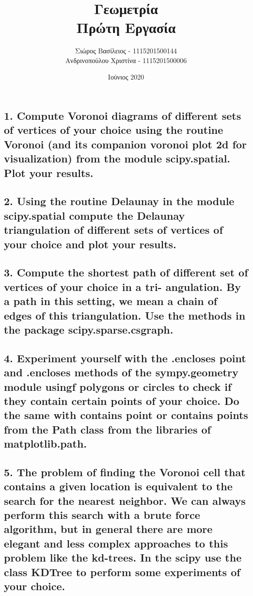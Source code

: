 \documentclass[12pt]{article}
\title{\hugeΥπολογιστική Γεωμετρία\\Πρώτη Εργασία}
\author{Σιώρος Βασίλειος - 1115201500144\\Ανδρινοπούλου Χριστίνα - 1115201500006}
\date{Ιούνιος 2020}
\begin{document}
\maketitle


\pagebreak


\subsection*{1. Compute Voronoi diagrams of different sets of vertices of your choice using
the routine Voronoi (and its companion voronoi plot 2d for visualization) from the module
scipy.spatial. Plot your results.}

\vspace{2in}

\pagebreak

\subsection*{2. Using the routine Delaunay in the module scipy.spatial compute the Delaunay
triangulation of different sets of vertices of your choice and plot your results.}

\vspace{2in}

\pagebreak

\subsection*{3. Compute the shortest path of different set of vertices of your choice in a tri-
angulation. By a path in this setting, we mean a chain of edges of this triangulation. Use the
methods in the package scipy.sparse.csgraph.}

\vspace{2in}

\pagebreak

\subsection*{4. Experiment yourself with the .encloses point and .encloses methods of the
sympy.geometry module usingf polygons or circles to check if they contain certain points of
your choice. Do the same with contains point or contains points from the Path class from the
libraries of matplotlib.path.}

\vspace{2in}

\pagebreak

\subsection*{5. The problem of finding the Voronoi cell that contains a given location is
equivalent to the search for the nearest neighbor. We can always perform this search with a
brute force algorithm, but in general there are more elegant and less complex approaches to
this problem like the kd-trees. In the scipy use the class KDTree to perform some experiments
of your choice.}

\vspace{2in}

\pagebreak
\end{document}
